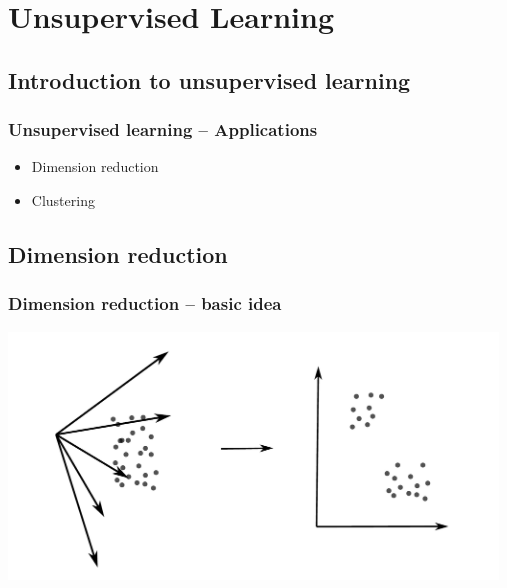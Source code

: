 \documentclass[aspectratio=169]{beamer}
\begin{document}
\section{Unsupervised Learning}

\setcounter{tocdepth}{1}
\begin{frame}{}
   \tableofcontents[currentsection]
\end{frame}

\subsection{Introduction to unsupervised learning}

\setcounter{tocdepth}{2}
\begin{frame}{}
   \tableofcontents[currentsubsection,hideothersubsections,
     subsectionstyle=show/shaded]
\end{frame}

\begin{frame}
  \frametitle{Unsupervised learning -- Applications}
  \begin{block}{}
    \begin{itemize}
    \item Dimension reduction
    \item Clustering
    \end{itemize}
  \end{block}
\end{frame}

\subsection{Dimension reduction}

\setcounter{tocdepth}{2}
\begin{frame}{}
   \tableofcontents[currentsubsection,hideothersubsections,
     subsectionstyle=show/shaded]
\end{frame}

\begin{frame}
  \frametitle{Dimension reduction -- basic idea}
  \begin{center}
    \includegraphics[width=13.0cm]{images/dimension_reduction.pdf}
  \end{center}
\end{frame}
\end{document}
